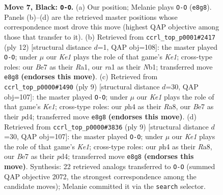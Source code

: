 \documentclass[11pt]{article}
\begin{document}
\begin{figure}[p]
\caption{\textbf{Move 7, Black: \texttt{O-O}.} (a) Our position; Melanie plays \texttt{O-O} (\texttt{e8g8}). Panels (b)--(d) are the retrieved master positions whose correspondence most drove this move (highest QAP objective among those that transfer to it). (b) Retrieved from \texttt{ccrl\_top\_p0001\#2417} (ply 12) [structural distance $d$=1, QAP obj=108]: the master played \texttt{O-O}; under $\mu$ our \emph{Ke1} plays the role of that game's \emph{Ke1}; cross-type roles: our \emph{B}e7 as their \emph{R}a1, our \emph{r}a1 as their \emph{N}b1; transferred move \texttt{e8g8} \textbf{(endorses this move)}. (c) Retrieved from \texttt{ccrl\_top\_p0000\#1490} (ply 9) [structural distance $d$=30, QAP obj=107]: the master played \texttt{O-O}; under $\mu$ our \emph{Ke1} plays the role of that game's \emph{Ke1}; cross-type roles: our \emph{p}h4 as their \emph{R}a8, our \emph{B}e7 as their \emph{p}d4; transferred move \texttt{e8g8} \textbf{(endorses this move)}. (d) Retrieved from \texttt{ccrl\_top\_p0000\#3836} (ply 9) [structural distance $d$=30, QAP obj=107]: the master played \texttt{O-O}; under $\mu$ our \emph{Ke1} plays the role of that game's \emph{Ke1}; cross-type roles: our \emph{p}h4 as their \emph{R}a8, our \emph{B}e7 as their \emph{p}d4; transferred move \texttt{e8g8} \textbf{(endorses this move)}. Synthesis: 22 retrieved analogs transferred to \texttt{O-O} (summed QAP objective 2072, the strongest correspondence among the candidate moves); Melanie committed it via the \texttt{search} selector.}
\label{fig:thought-m13}
\end{figure}

\clearpage
\end{document}
